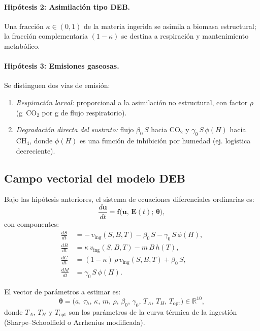 \paragraph{Hipótesis 2: Asimilación tipo DEB.}
Una fracción $\kappa \in (0,1)$ de la materia ingerida se asimila a biomasa estructural; la fracción complementaria $(1-\kappa)$ se destina a respiración y mantenimiento metabólico.

\paragraph{Hipótesis 3: Emisiones gaseosas.}
Se distinguen dos vías de emisión:
\begin{enumerate}
    \item \textit{Respiración larval:} proporcional a la asimilación no estructural, con factor $\rho$ (g~$\mathrm{CO}_2$ por g de flujo respiratorio).
    \item \textit{Degradación directa del sustrato:} flujo $\beta_0\,S$ hacia $\mathrm{CO}_2$ y $\gamma_0\,S\,\phi(H)$ hacia $\mathrm{CH}_4$, donde $\phi(H)$ es una función de inhibición por humedad (ej. logística decreciente).
\end{enumerate}

\subsection{Campo vectorial del modelo DEB}

Bajo las hipótesis anteriores, el sistema de ecuaciones diferenciales ordinarias es:
\begin{equation}
\label{eq:sistema_deb}
\frac{d\mathbf{u}}{dt} = \mathbf{f}\bigl(\mathbf{u},\, \mathbf{E}(t);\, \boldsymbol{\theta}\bigr),
\end{equation}
con componentes:
\begin{align}
\frac{dS}{dt} &= -\,v_{\text{ing}}(S,B,T) - \beta_0\,S - \gamma_0\,S\,\phi(H), \label{eq:dS} \\[6pt]
\frac{dB}{dt} &= \kappa\,v_{\text{ing}}(S,B,T) - m\,B\,h(T), \label{eq:dB} \\[6pt]
\frac{dC}{dt} &= (1-\kappa)\,\rho\,v_{\text{ing}}(S,B,T) + \beta_0\,S, \label{eq:dC} \\[6pt]
\frac{dM}{dt} &= \gamma_0\,S\,\phi(H). \label{eq:dM}
\end{align}

El vector de parámetros a estimar es:
\begin{equation}
\boldsymbol{\theta} = \bigl( a,\, \tau_h,\, \kappa,\, m,\, \rho,\, \beta_0,\, \gamma_0,\, T_A,\, T_H,\, T_{\text{opt}} \bigr) \in \mathbb{R}^{10},
\end{equation}
donde $T_A$, $T_H$ y $T_{\text{opt}}$ son los parámetros de la curva térmica de la ingestión (Sharpe--Schoolfield o Arrhenius modificada).

